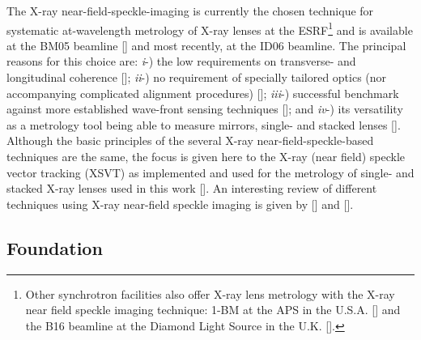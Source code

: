 \begin{refsection}
The X-ray near-field-speckle-imaging is currently the chosen technique for systematic at-wavelength metrology of X-ray lenses at the ESRF\footnote{Other synchrotron facilities also offer X-ray lens metrology with the X-ray near field speckle imaging technique: 1-BM at the APS in the U.S.A. [\cite{Qiao2020}] and the B16 beamline at the Diamond Light Source in the U.K. [\cite{Sawhney2013}].} and is available at the BM05 beamline [\cite{Berujon2020a}] and most recently, at the ID06 beamline. The principal reasons for this choice are: \textit{i}-) the low requirements on transverse- and longitudinal coherence [\cite{Zanette2014,Zdora2015,Wang2016}]; \textit{ii}-) no requirement of specially tailored optics (nor accompanying complicated alignment procedures) [\cite{Morgan2012,Wang2016}]; \textit{iii}-) successful benchmark against more established wave-front sensing techniques [\cite{Kashyap2016,Romell2017}]; and \textit{iv}-) its versatility as a metrology tool being able to measure mirrors, single- and stacked lenses [\cite{Berujon2020a}]. Although the basic principles of the several X-ray near-field-speckle-based techniques are the same, the focus is given here to the X-ray (near field) speckle vector tracking (XSVT) as implemented and used for the metrology of single- and stacked X-ray lenses used in this work [\cite{Berujon2020a,Berujon2020}]. An interesting review of different techniques using X-ray near-field speckle imaging is given by [\cite{Zdora2018a}] and [\cite{Berujon2020}].

\subsection{Foundation}\label{sec:foundation}


\end{refsection}
